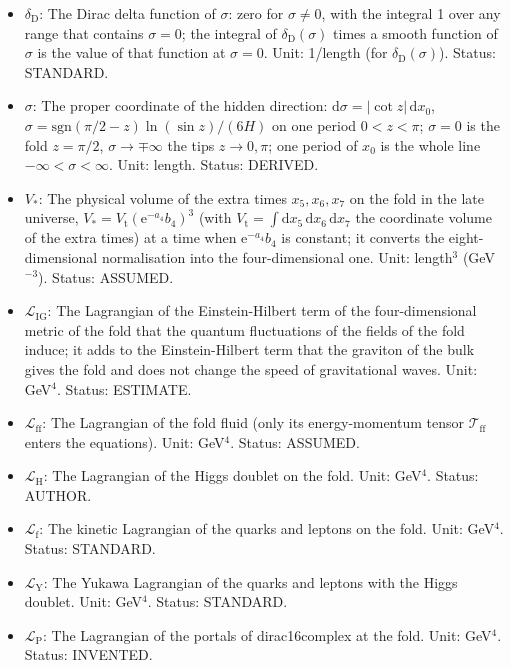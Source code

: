 \documentclass[
  10pt,
]{article}
\begin{document}
\begin{itemize}
\item
  \(\delta_{\mathrm{D}}\): The Dirac delta function of \(\sigma\): zero
  for \(\sigma \ne 0\), with the integral 1 over any range that contains
  \(\sigma = 0\); the integral of \(\delta_{\mathrm{D}}(\sigma)\) times
  a smooth function of \(\sigma\) is the value of that function at
  \(\sigma = 0\). Unit: 1/length (for \(\delta_{\mathrm{D}}(\sigma)\)).
  Status: STANDARD.
\item
  \(\sigma\): The proper coordinate of the hidden direction:
  \(\mathrm{d}\sigma = \lvert\cot z\rvert\,\mathrm{d}x_0\),
  \(\sigma = \mathrm{sgn}(\pi/2 - z)\ln(\sin z)/(6H)\) on one period
  \(0 < z < \pi\); \(\sigma = 0\) is the fold \(z = \pi/2\),
  \(\sigma \to \mp\infty\) the tips \(z \to 0, \pi\); one period of
  \(x_0\) is the whole line \(-\infty < \sigma < \infty\). Unit: length.
  Status: DERIVED.
\item
  \(V_*\): The physical volume of the extra times \(x_5, x_6, x_7\) on
  the fold in the late universe,
  \(V_* = V_{\mathrm{t}}(\mathrm{e}^{-a_4}b_4)^3\) (with
  \(V_{\mathrm{t}} = \int\mathrm{d}x_5\,\mathrm{d}x_6\,\mathrm{d}x_7\)
  the coordinate volume of the extra times) at a time when
  \(\mathrm{e}^{-a_4}b_4\) is constant; it converts the
  eight-dimensional normalisation into the four-dimensional one. Unit:
  length\(^3\) (GeV\(^{-3}\)). Status: ASSUMED.
\item
  \(\mathcal{L}_{\mathrm{IG}}\): The Lagrangian of the Einstein-Hilbert
  term of the four-dimensional metric of the fold that the quantum
  fluctuations of the fields of the fold induce; it adds to the
  Einstein-Hilbert term that the graviton of the bulk gives the fold and
  does not change the speed of gravitational waves. Unit: GeV\(^4\).
  Status: ESTIMATE.
\item
  \(\mathcal{L}_{\mathrm{ff}}\): The Lagrangian of the fold fluid (only
  its energy-momentum tensor \(\mathcal{T}_{\mathrm{ff}}\) enters the
  equations). Unit: GeV\(^4\). Status: ASSUMED.
\item
  \(\mathcal{L}_{\mathrm{H}}\): The Lagrangian of the Higgs doublet on
  the fold. Unit: GeV\(^4\). Status: AUTHOR.
\item
  \(\mathcal{L}_{\mathrm{f}}\): The kinetic Lagrangian of the quarks and
  leptons on the fold. Unit: GeV\(^4\). Status: STANDARD.
\item
  \(\mathcal{L}_{\mathrm{Y}}\): The Yukawa Lagrangian of the quarks and
  leptons with the Higgs doublet. Unit: GeV\(^4\). Status: STANDARD.
\item
  \(\mathcal{L}_{\mathrm{P}}\): The Lagrangian of the portals of
  dirac16complex at the fold. Unit: GeV\(^4\). Status: INVENTED.
\end{itemize}
\end{document}

